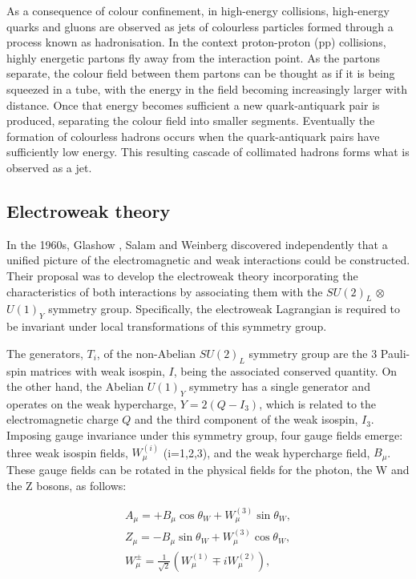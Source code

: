 As a consequence of colour confinement, in high-energy collisions, high-energy quarks and gluons are observed as jets \cite{Hadronisation_Jets} of colourless particles formed through a process known as hadronisation. In the context proton-proton (pp) collisions, highly energetic partons fly away from the interaction point. As the partons separate, the colour field between them partons can be thought as if it is being squeezed in a tube, with the energy in the field becoming increasingly larger with distance. Once that energy becomes sufficient a new quark-antiquark pair is produced, separating the colour field into smaller segments. Eventually the formation of colourless hadrons occurs when the quark-antiquark pairs have sufficiently low energy. This resulting cascade of collimated hadrons forms what is observed as a jet.

\subsection{Electroweak theory}

In the 1960s, Glashow \cite{Glashow}, Salam \cite{Salam} and Weinberg \cite{Weinberg} discovered independently that a unified picture of the electromagnetic and weak interactions could be constructed. Their proposal was to develop the electroweak theory incorporating the characteristics of both interactions by associating them with the $SU(2)_{L}$ $\otimes$ $U(1)_{Y}$ symmetry group. Specifically, the electroweak Lagrangian is required to be invariant under local transformations of this symmetry group.

The generators, $T_{i}$, of the non-Abelian $SU(2)_{L}$ symmetry group are the 3 Pauli-spin matrices with weak isospin, $I$, being the associated conserved quantity. On the other hand, the Abelian $U(1)_{Y}$ symmetry has a single generator and operates on the weak hypercharge, $Y = 2(Q-I_{3})$, which is related to the electromagnetic charge $Q$ and the third component of the weak isospin, $I_{3}$. Imposing gauge invariance under this symmetry group, four gauge fields emerge: three weak isospin fields, $W_{\mu}^{(i)}$ (i=1,2,3), and the weak hypercharge field, $B_{\mu}$. These gauge fields can be rotated in the physical fields for the photon, the W and the Z bosons, as follows:

\begin{equation}
\begin{array}{c}
A_{\mu} = + B_{\mu} \cos{\theta_{W}} + W_{\mu}^{(3)} \sin{\theta_{W}}, \\
Z_{\mu} = - B_{\mu} \sin{\theta_{W}} + W_{\mu}^{(3)} \cos{\theta_{W}}, \\
W_{\mu}^{\pm} = \frac{1}{\sqrt{2}} (W_{\mu}^{(1)} \mp iW_{\mu}^{(2)}),
\end{array}
\label{Equation:Introduction_PhysicalGaugeFields}
\end{equation}

